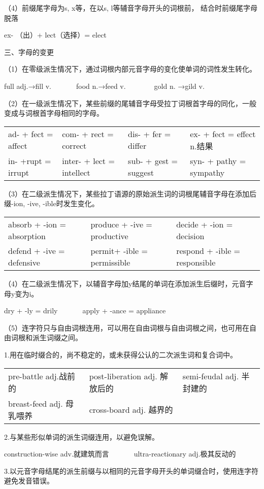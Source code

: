 （4）前缀尾字母为s, x等，在以s, l等辅音字母开头的词根前， 结合时前缀尾字母脱落

ex- （出）+ lect（选择）= elect 

三、字母的变更

（1）在零级派生情况下，通过词根内部元音字母的变化使单词的词性发生转化。

full adj.→fill v.~~~~~~~food n.→feed v.~~~~~~~~gold n. →gild v.

（2）在一级派生情况下，某些前缀的尾辅音字母受拉丁词根首字母的同化，一般变成与词根首字母相同的字母。

\begin{tabular}{@{}llll@{}}
ad- + fect = affect&com- + rect = correct&dis- + fer = differ&ex- + fect = effect n.结果\\
in- +rupt = irrupt&inter- + lect = intellect&sub- + gest = suggest&syn- + pathy = sympathy
\end{tabular}

（3）在二级派生情况下，某些拉丁语源的原始派生词的词根尾辅音字母在添加后缀-ion, -ive, -ible时发生变化。

\begin{tabular}{@{}lll@{}}
absorb + -ion = absorption&produce + -ive = productive&decide + -ion = decision\\
defend + -ive = defensive&permit+ -ible = permissible&respond + -ible = responsible
\end{tabular}

（4）在二级派生情况下，以辅音字母加y结尾的单词在添加派生后缀时，元音字母y变为i。

dry + -ly = drily~~~~~~~apply + -ance = appliance

（5）连字符只与自由词根连用，可以用在自由词根与自由词根之间，也可用在自由词根和派生词缀之间。

1.用在临时缀合的，尚不稳定的，或未获得公认的二次派生词和复合词中。

\begin{tabular}{@{}lll@{}}
pre-battle adj.战前的&post-liberation adj. 解放后的&semi-feudal adj. 半封建的\\
breast-feed adj. 母乳喂养&cross-board adj. 越界的&
\end{tabular}

2.与某些形似单词的派生词缀连用，以避免误解。

construction-wise adv.就建筑而言~~~~~~~ultra-reactionary adj.极其反动的

3.以元音字母结尾的派生前缀与以相同的元音字母开头的单词缀合时，使用连字符避免发音错误。

